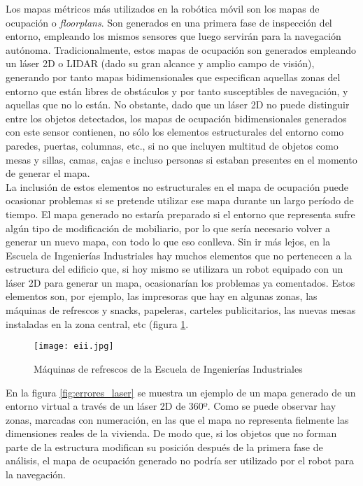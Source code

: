 Los mapas métricos más utilizados en la robótica móvil son los mapas de ocupación o \textit{floorplans}. Son generados en una primera fase de inspección del entorno, empleando los mismos sensores que luego servirán para la navegación autónoma. Tradicionalmente, estos mapas de ocupación son generados empleando un láser 2D o LIDAR (dado su gran alcance y amplio campo de visión), generando por tanto mapas bidimensionales que especifican aquellas zonas del entorno que están libres de obstáculos y por tanto susceptibles de navegación, y aquellas que no lo están. No obstante, dado que un láser 2D no puede distinguir entre los objetos detectados, los mapas de ocupación bidimensionales generados con este sensor contienen, no sólo los elementos estructurales del entorno como paredes, puertas, columnas, etc., si no que incluyen multitud de objetos como mesas y sillas, camas, cajas e incluso personas si estaban presentes en el momento de generar el mapa.\\

La inclusión de estos elementos no estructurales en el mapa de ocupación puede ocasionar problemas si se pretende utilizar ese mapa durante un largo período de tiempo. El mapa generado no estaría preparado si el entorno que representa sufre algún tipo de modificación de mobiliario, por lo que sería necesario volver a generar un nuevo mapa, con todo lo que eso conlleva. Sin ir más lejos, en la Escuela de Ingenierías Industriales hay muchos elementos que no pertenecen a la estructura del edificio que, si hoy mismo se utilizara un robot equipado con un láser 2D para generar un mapa, ocasionarían los problemas ya comentados. Estos elementos son, por ejemplo, las impresoras que hay en algunas zonas, las máquinas de refrescos y snacks, papeleras, carteles publicitarios, las nuevas mesas instaladas en la zona central, etc (figura \ref{fig:eii}.\\

\begin{figure}[h]
	\begin{center} 
	\texttt{[image: eii.jpg]}
	\end{center}
	\caption{Máquinas de refrescos de la Escuela de Ingenierías Industriales}
	\label{fig:eii}
\end{figure}

En la figura \ref{fig:errores_laser} se muestra un ejemplo de un mapa generado de un entorno virtual a través de un láser 2D de 360º. Como se puede observar hay zonas, marcadas con numeración, en las que el mapa no representa fielmente las dimensiones reales de la vivienda. De modo que, si los objetos que no forman parte de la estructura modifican su posición después de la primera fase de análisis, el mapa de ocupación generado no podría ser utilizado por el robot para la navegación. \\

